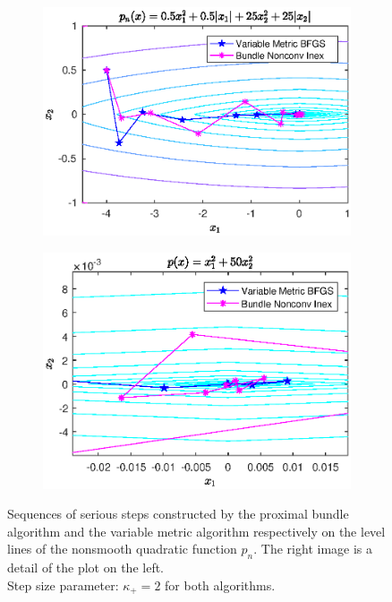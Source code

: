 \begin{figure}[H]
	\begin{subfigure}[t]{0.49\textwidth}
		\includegraphics[width=\textwidth]{Pictures/Plots/final_nonsm_parab.eps}
	\end{subfigure}%
	\hfill
	\begin{subfigure}[t]{0.49\textwidth}
			\includegraphics[width=\textwidth]{Pictures/Plots/final_nonsm_parab_detail.eps}
	\end{subfigure}
	\caption[Serious steps on nonsmooth quadratic]{Sequences of serious steps constructed by the proximal bundle algorithm and the variable metric algorithm respectively on the level lines of the nonsmooth quadratic function \(p_n\). The right image is a detail of the plot on the left.\\
	Step size parameter: \(\kappa_+ = 2\) for both algorithms.}
	\label{fig_contour_nonsm_parab}
\end{figure}


